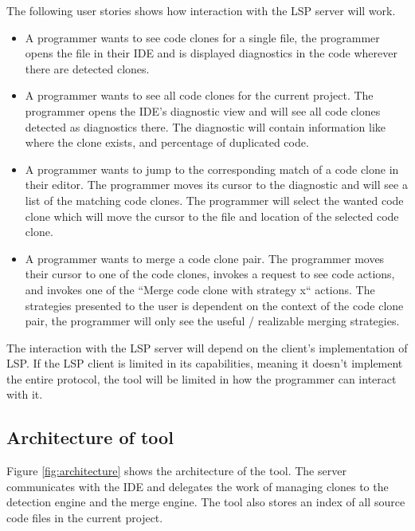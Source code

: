 \documentclass[12pt]{article}
\begin{document}
The following user stories shows how interaction with the LSP server will work.

\begin{itemize}
	\item A programmer wants to see code clones for a single file, the
	      programmer opens the file in their IDE and is displayed diagnostics in the code
	      wherever there are detected clones.

	\item A programmer wants to see all code clones for the current project. The
	      programmer opens the IDE's diagnostic view and will see all code clones detected
	      as diagnostics there. The diagnostic will contain information like where the clone
	      exists, and percentage of duplicated code.

	\item A programmer wants to jump to the corresponding match of a code clone in their
	      editor. The programmer moves its cursor to the diagnostic and will see a list of
	      the matching code clones. The programmer will select the wanted code clone which
	      will move the cursor to the file and location of the selected code clone.

	\item A programmer wants to merge a code clone pair. The programmer moves their cursor
	      to one of the code clones, invokes a request to see code actions, and invokes one
	      of the ``Merge code clone with strategy x`` actions. The strategies presented to
	      the user is dependent on the context of the code clone pair, the programmer will
	      only see the useful / realizable merging strategies.
\end{itemize}

The interaction with the LSP server will depend on the client's implementation of LSP. If
the LSP client is limited in its capabilities, meaning it doesn't implement the entire
protocol, the tool will be limited in how the programmer can interact with it.

\subsection{Architecture of tool}

Figure \ref{fig:architecture} shows the architecture of the tool. The server communicates
with the IDE and delegates the work of managing clones to the detection engine and the
merge engine. The tool also stores an index of all source code files in the current project.
\end{document}
